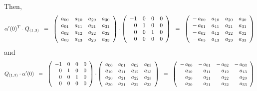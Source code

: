 Then,
\begin{equation*}
\alpha^{\prime}(0)^{T} \cdot Q_{(1,3)}
\;\; = \;\;
	\left(\begin{array}{cccc}
	a_{00} & a_{10} & a_{20} & a_{30}
	\\
	a_{01} & a_{11} & a_{21} & a_{31}
	\\
	a_{02} & a_{12} & a_{22} & a_{32}
	\\
	a_{03} & a_{13} & a_{23} & a_{33}
	\end{array}\right)
	\cdot
	\left(\begin{array}{rrrr}
	-1 & 0 & 0 & 0
	\\
	0 & 1 & 0 & 0
	\\
	0 & 0 & 1 & 0
	\\
	0 & 0 & 0 & 0
	\end{array}\right)
\;\; = \;\;
	\left(\begin{array}{cccc}
	-\,a_{00} & a_{10} & a_{20} & a_{30}
	\\
	-\,a_{01} & a_{11} & a_{21} & a_{31}
	\\
	-\,a_{02} & a_{12} & a_{22} & a_{32}
	\\
	-\,a_{03} & a_{13} & a_{23} & a_{33}
	\end{array}\right)
\end{equation*}
and
\begin{equation*}
Q_{(1,3)} \cdot \alpha^{\prime}(0)
\;\; = \;\;
	\left(\begin{array}{rrrr}
	-1 & 0 & 0 & 0
	\\
	0 & 1 & 0 & 0
	\\
	0 & 0 & 1 & 0
	\\
	0 & 0 & 0 & 0
	\end{array}\right)
	\cdot
	\left(\begin{array}{cccc}
	a_{00} & a_{01} & a_{02} & a_{03}
	\\
	a_{10} & a_{11} & a_{12} & a_{13}
	\\
	a_{20} & a_{21} & a_{22} & a_{23}
	\\
	a_{30} & a_{31} & a_{32} & a_{33}
	\end{array}\right)
\;\; = \;\;
	\left(\begin{array}{rrrr}
	-\,a_{00} & -\,a_{01} & -\,a_{02} & -\,a_{03}
	\\
	a_{10} & a_{11} & a_{12} & a_{13}
	\\
	a_{20} & a_{21} & a_{22} & a_{23}
	\\
	a_{30} & a_{31} & a_{32} & a_{33}
	\end{array}\right)
\end{equation*}
